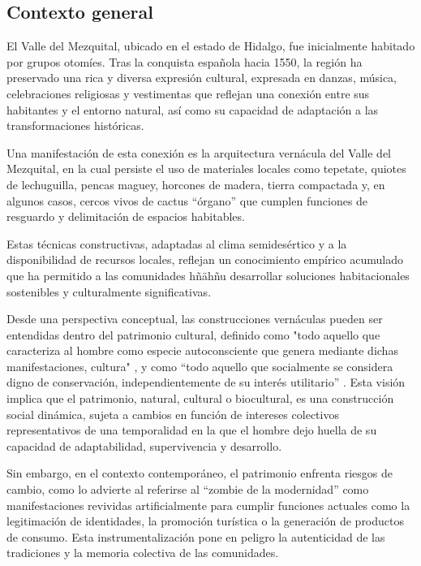 \subsection{Contexto general}

El Valle del Mezquital, ubicado en el estado de Hidalgo, fue inicialmente habitado por grupos otomíes. Tras la conquista española hacia 1550, la región ha preservado una rica y diversa expresión cultural, expresada en danzas, música, celebraciones religiosas y vestimentas que reflejan una conexión entre sus habitantes y el entorno natural, así como su capacidad de adaptación a las transformaciones históricas.

Una manifestación de esta conexión es la arquitectura vernácula del Valle del Mezquital, en la cual persiste el uso de materiales locales como tepetate, quiotes de lechuguilla, pencas maguey, horcones de madera, tierra compactada y, en algunos casos, cercos vivos de cactus ``órgano'' que cumplen funciones de resguardo y delimitación de espacios habitables.

Estas técnicas constructivas, adaptadas al clima semidesértico y a la disponibilidad de recursos locales, reflejan un conocimiento empírico acumulado que ha permitido a las comunidades hñähñu desarrollar soluciones habitacionales sostenibles y culturalmente significativas.

Desde una perspectiva conceptual, las construcciones vernáculas pueden ser entendidas dentro del patrimonio cultural, definido como "todo aquello que caracteriza al hombre como especie autoconsciente que genera mediante dichas manifestaciones, cultura" \citep{dominguez2004pautas}, y como ``todo aquello que socialmente se considera digno de conservación, independientemente de su interés utilitario'' \citep[p. 63]{prats1998concepto}. Esta visión implica que el patrimonio, natural, cultural o biocultural, es una construcción social dinámica, sujeta a cambios en función de intereses colectivos representativos de una temporalidad en la que el hombre dejo huella de su capacidad de adaptabilidad, supervivencia y desarrollo.

Sin embargo, en el contexto contemporáneo, el patrimonio enfrenta riesgos de cambio, como lo advierte \cite{i2008zombi} al referirse al ``zombie de la modernidad'' como manifestaciones revividas artificialmente para cumplir funciones actuales como la legitimación de identidades, la promoción turística o la generación de productos de consumo. Esta instrumentalización pone en peligro la autenticidad de las tradiciones y la memoria colectiva de las comunidades.


